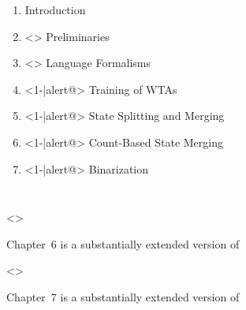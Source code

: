 \documentclass[beamer]{standalone}
\begin{document}
\begin{standaloneframe}{\jobname}
	\begin{columns}
		\begin{enumerate}
		\item
			Introduction
		\item<\tlUncover>
			Preliminaries
		\item<\tlUncover>
			Language Formalisms
		\item<1-|alert@\tlTrainingOfWTAs>
			Training of WTAs
		\item<1-|alert@\tlStateSplittingAndMerging>
			State Splitting and Merging
		\item<1-|alert@\tlCountBasedStateMerging>
			Count-Based State Merging
		\item<1-|alert@\tlBinarization>
			Binarization
		\end{enumerate}
	\end{columns}
	\only<\tlCountBasedStateMerging>{%
		\vspace{1em}
		\begin{block}{Chapter~6 is a substantially extended version of}
		\end{block}
	}%
	\only<\tlBinarization>{%
		\vspace{0.5em}
		\begin{block}{Chapter~7 is a substantially extended version of}
		\end{block}
	}%
\end{standaloneframe}
\end{document}
